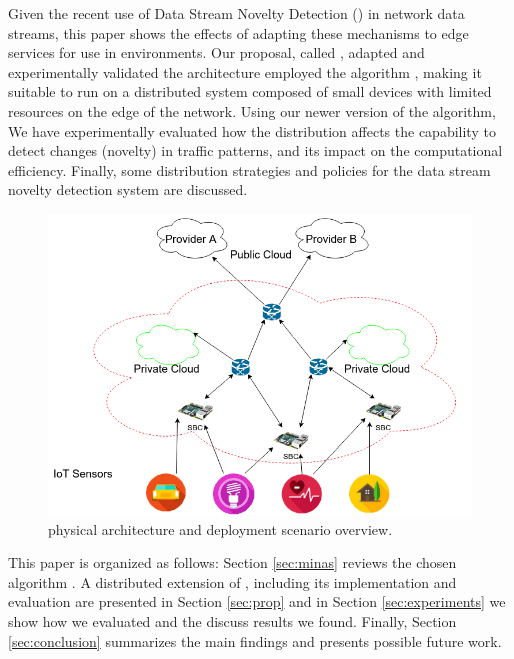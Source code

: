 Given the recent use of Data Stream Novelty Detection (\nd) in network data
streams, this paper shows the effects of adapting these mechanisms to edge
services for use in \iot environments.
Our proposal, called \mfog, adapted and experimentally validated the \arch
architecture \cite{Cassales2019a} employed the \nd algorithm \minas
\cite{Faria2013Minas,Faria2015minas}, making it suitable to run
on a distributed system composed of small devices with limited
resources on the edge of the network.
Using our newer version of the \minas algorithm, We have experimentally evaluated 
how the distribution 
affects the capability to detect changes (novelty) in
traffic patterns, and its impact on the computational efficiency.
Finally, some distribution strategies and policies for the data stream
novelty detection system are discussed.

\begin{figure}[hbt]
    \centering
    \includegraphics[width=0.5\linewidth]{figures/cassalesimgs-000.png}
    \caption{\arch \cite{Cassales2019a} physical architecture and deployment scenario overview.}
    \label{fig:mfog-phy-arch-cloud}
\end{figure}

This paper is organized as follows:
Section \ref{sec:minas} reviews the chosen \nd algorithm \minas.
A distributed extension of \minas, including its
implementation and evaluation are presented in Section \ref{sec:prop}
and in Section \ref{sec:experiments} we show how we evaluated \mfog and
the discuss results we found.
Finally, Section \ref{sec:conclusion} summarizes the main findings and presents
possible future work.

